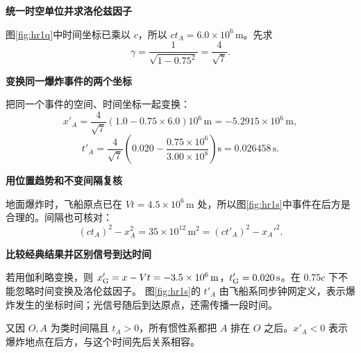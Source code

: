 \begin{solution}\textbf{统一时空单位并求洛伦兹因子}\par\nobreak
图\ref{fig:hr1q}中时间坐标已乘以 $c$，所以 $ct_A=6.0\times10^6\,\mathrm m$。先求
\[
\gamma=\frac1{\sqrt{1-0.75^2}}=\frac4{\sqrt7}.
\]


\par\medskip{}\noindent\textbf{变换同一爆炸事件的两个坐标}\par\nobreak
把同一个事件的空间、时间坐标一起变换：
\[
x'_A=\frac4{\sqrt7}(1.0-0.75\times6.0)10^6\,\mathrm m
=\boxed{-5.2915\times10^6\,\mathrm m},
\]
\[
t'_A=\frac4{\sqrt7}\left(0.020-\frac{0.75\times10^6}{3.00\times10^8}\right)\mathrm s
=\boxed{0.026458\,\mathrm s}.
\]



\par\medskip{}\noindent\textbf{用位置趋势和不变间隔复核}\par\nobreak
地面爆炸时，飞船原点已在 $Vt=4.5\times10^6\,\mathrm m$ 处，所以图\ref{fig:hr1s}中事件在后方是合理的。间隔也可核对：
\[
(ct_A)^2-x_A^2=35\times10^{12}\,\mathrm{m^2}
=(ct'_A)^2-x_A'^2.
\]


\par\medskip{}\noindent\textbf{比较经典结果并区别信号到达时间}\par\nobreak
若用伽利略变换，则 $x'_{\rm G}=x-Vt=-3.5\times10^6\,\mathrm m$，$t'_{\rm G}=0.020\,\mathrm s$。在 $0.75c$ 下不能忽略时间变换及洛伦兹因子。
图\ref{fig:hr1s}的 $t'_A$ 由飞船系同步钟网定义，表示爆炸发生的坐标时间；光信号随后到达原点，还需传播一段时间。

又因 $O,A$ 为类时间隔且 $t_A>0$，所有惯性系都把 $A$ 排在 $O$ 之后。$x'_A<0$ 表示爆炸地点在后方，与这个时间先后关系相容。
\end{solution}

